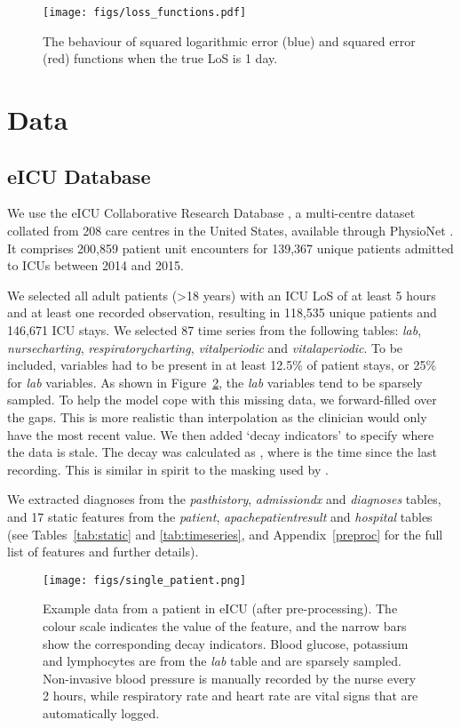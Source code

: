 \documentclass[sigconf]{acmart}
\begin{document}
\begin{figure}
  \centering
  \texttt{[image: figs/loss\_functions.pdf]}
  \caption{The behaviour of squared logarithmic error (blue) and squared error (red) functions when the true LoS is 1 day.}
 \label{fig:lossfunc}
\end{figure}

\section{Data}
\label{data}
\subsection{eICU Database}
We use the eICU Collaborative Research Database \citep{Pollard2018}, a multi-centre dataset collated from 208 care centres in the United States, available through PhysioNet \cite{Goldbergere215}. It comprises 200,859 patient unit encounters for 139,367 unique patients admitted to ICUs between 2014 and 2015. 

We selected all adult patients (\textgreater 18 years) with an ICU LoS of at least 5 hours and at least one recorded observation, resulting in 118,535 unique patients and 146,671 ICU stays. We selected 87 time series from the following tables: \textit{lab}, \textit{nursecharting}, \textit{respiratorycharting}, \textit{vitalperiodic} and \textit{vitalaperiodic}. To be included, variables had to be present in at least 12.5\% of patient stays, or 25\% for \textit{lab} variables. As shown in Figure~\ref{fig:one_patient}, the \textit{lab} variables tend to be sparsely sampled. To help the model cope with this missing data, we forward-filled over the gaps. This is more realistic than interpolation as the clinician would only have the most recent value. We then added `decay indicators' to specify where the data is stale. The decay was calculated as , where  is the time since the last recording. This is similar in spirit to the masking used by \citet{Che2018}.

We extracted diagnoses from the \textit{pasthistory}, \textit{admissiondx} and \textit{diagnoses} tables, and 17 static features from the \textit{patient}, \textit{apachepatientresult} and \textit{hospital} tables (see Tables~\ref{tab:static} and \ref{tab:timeseries}, and Appendix~\ref{preproc} for the full list of features and further details). 

\begin{figure}
  \centering
  \texttt{[image: figs/single\_patient.png]}
  \caption{Example data from a patient in eICU (after pre-processing). The colour scale indicates the value of the feature, and the narrow bars show the corresponding decay indicators. Blood glucose, potassium and lymphocytes are from the \textit{lab} table and are sparsely sampled. Non-invasive blood pressure is manually recorded by the nurse every 2 hours, while respiratory rate and heart rate are vital signs that are automatically logged.}
  \label{fig:one_patient}
\end{figure}
\end{document}
